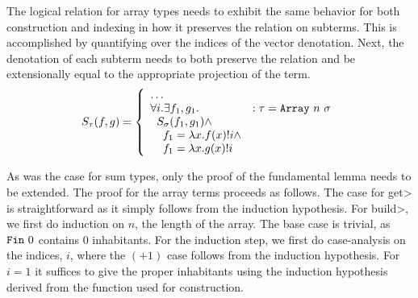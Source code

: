   The logical relation for array types needs to exhibit the same behavior for both construction and indexing in how it preserves the relation on subterms.
  This is accomplished by quantifying over the indices of the vector denotation.
  Next, the denotation of each subterm needs to both preserve the relation and be extensionally equal to the appropriate projection of the term.
  \begin{equation}
    S_\tau(f, g) =
      \left\{
        \begin{array}{ll}
          \dots \\
          \forall i. \exists f_1, g_1.
            & : \tau = \texttt{Array}\ n\ \sigma \\
          \;\;S_\sigma(f_1, g_1) \wedge \\
          \;\;\;\;f_1 = \lambda x. f(x)!i \wedge \\
          \;\;\;\;f_1 = \lambda x. g(x)!i \\
        \end{array}
      \right.
  \label{eqn:lr_array}
  \end{equation}

  As was the case for sum types, only the proof of the fundamental lemma needs to be extended.
  The proof for the array terms proceeds as follows.
  The case for \<get> is straightforward as it simply follows from the induction hypothesis.
  For \<build>, we first do induction on $n$, the length of the array.
  The base case is trivial, as $\texttt{Fin}\ 0$ contains $0$ inhabitants.
  For the induction step, we first do case-analysis on the indices, $i$, where the $(+1)$ case follows from the induction hypothesis.
  For $i=1$ it suffices to give the proper inhabitants using the induction hypothesis derived from the function used for construction.
